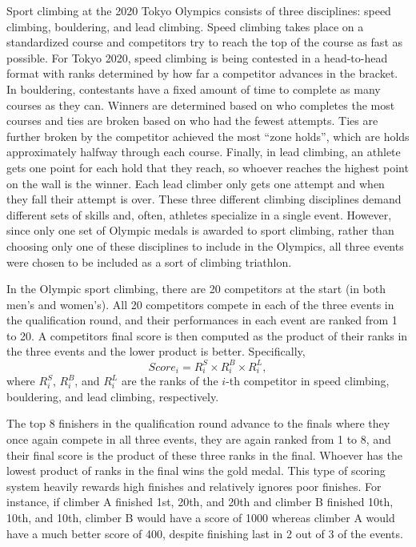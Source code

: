 \documentclass[12pt]{article}
\begin{document}
Sport climbing at the 2020 Tokyo Olympics consists of three disciplines:
speed climbing, bouldering, and lead climbing. Speed climbing takes
place on a standardized course and competitors try to reach the top of
the course as fast as possible. For Tokyo 2020, speed climbing is being
contested in a head-to-head format with ranks determined by how far a
competitor advances in the bracket. In bouldering, contestants have a
fixed amount of time to complete as many courses as they can. Winners
are determined based on who completes the most courses and ties are
broken based on who had the fewest attempts. Ties are further broken by
the competitor achieved the most ``zone holds'', which are holds
approximately halfway through each course. Finally, in lead climbing, an
athlete gets one point for each hold that they reach, so whoever reaches
the highest point on the wall is the winner. Each lead climber only gets
one attempt and when they fall their attempt is over. These three
different climbing disciplines demand different sets of skills and,
often, athletes specialize in a single event. However, since only one
set of Olympic medals is awarded to sport climbing, rather than choosing
only one of these disciplines to include in the Olympics, all three
events were chosen to be included as a sort of climbing triathlon.

In the Olympic sport climbing, there are 20 competitors at the start (in
both men's and women's). All 20 competitors compete in each of the three
events in the qualification round, and their performances in each event
are ranked from 1 to 20. A competitors final score is then computed as
the product of their ranks in the three events and the lower product is
better. Specifically, \begin{equation}
Score_i = R^S_i\times R^B_i\times R^L_i,
\end{equation} where \(R^S_i\), \(R^B_i\), and \(R^L_i\) are the ranks
of the \(i\)-th competitor in speed climbing, bouldering, and lead
climbing, respectively.

The top 8 finishers in the qualification round advance to the finals
where they once again compete in all three events, they are again ranked
from 1 to 8, and their final score is the product of these three ranks
in the final. Whoever has the lowest product of ranks in the final wins
the gold medal. This type of scoring system heavily rewards high
finishes and relatively ignores poor finishes. For instance, if climber
A finished 1st, 20th, and 20th and climber B finished 10th, 10th, and
10th, climber B would have a score of 1000 whereas climber A would have
a much better score of 400, despite finishing last in 2 out of 3 of the
events.
\end{document}
